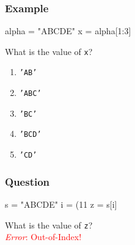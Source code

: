 \documentclass[11pt]{beamer}
\begin{document}
\begin{frame}[fragile]
  \frametitle{Example}
  \Enlarge

  \begin{semiverbatim}
alpha = "ABCDE"
x = alpha[1:3]
  \end{semiverbatim}
  What is the value of \texttt{x}?
  \begin{enumerate}[label=\Alph*]
  \item  \texttt{'AB'}
  \item  \texttt{'ABC'}
  \item  \texttt{'BC'}
  \item  \texttt{'BCD'}
  \item  \texttt{'CD'}
  \end{enumerate}
\end{frame}

\begin{frame}[fragile]
  \frametitle{Question}
  \Enlarge

  \begin{semiverbatim}
s = "ABCDE"
i = (11 %
z = s[i]
  \end{semiverbatim}

  What is the value of \texttt{z}? \\\vspace{2mm}\pause
  \textcolor{red}{\emph{Error}: Out-of-Index!}
\end{frame}
\end{document}
